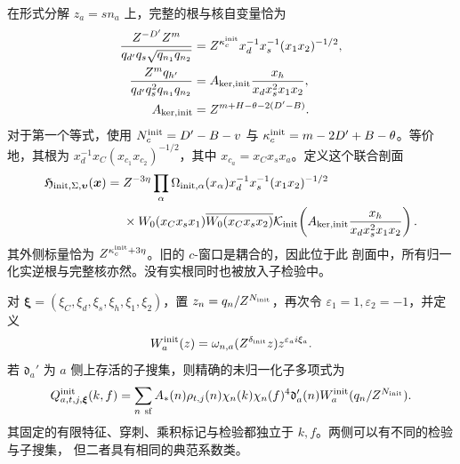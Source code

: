 在形式分解 \(z_a=sn_a\) 上，完整的根与核自变量恰为
\begin{equation}\label{eq:initial-root-kernel}
 \begin{split}
 \frac{Z^{-D'}Z^m}{q_{d'}q_s\sqrt{q_{n_1}q_{n_2}}}
 &=Z^{\kappa_c^{\rm init}}x_d^{-1}x_s^{-1}(x_1x_2)^{-1/2},\\
 \frac{Z^mq_{h'}}{q_{d'}q_s^2q_{n_1}q_{n_2}}
 &=A_{{\rm ker},{\rm init}}\frac{x_h}{x_dx_s^2x_1x_2},\\
 A_{{\rm ker},{\rm init}}&=Z^{m+H-\theta-2(D'-B)}.
 \end{split}
\end{equation}
对于第一个等式，使用 \(N_c^{\rm init}=D'-B-v\) 与
\(\kappa_c^{\rm init}=m-2D'+B-\theta\)。等价地，其根为
\(x_d^{-1}x_C(x_{c_1}x_{c_2})^{-1/2}\)，其中 \(x_{c_a}=x_Cx_sx_a\)。定义这个联合剖面
\begin{equation}\label{eq:initial-joint-profile}
 \begin{split}
 \mathfrak H_{{\rm init},\Sigma,\boldsymbol\upsilon}(\boldsymbol x)
 ={}&Z^{-3\eta}\prod_\alpha\Omega_{{\rm init},\alpha}(x_\alpha)
 x_d^{-1}x_s^{-1}(x_1x_2)^{-1/2}\\
 &\times W_0(x_Cx_sx_1)\overline{W_0(x_Cx_sx_2)}
 \mathcal K_{\rm init}\!\left(
 A_{{\rm ker},{\rm init}}\frac{x_h}{x_dx_s^2x_1x_2}\right).
 \end{split}
\end{equation}
其外侧标量恰为 \(Z^{\kappa_c^{\rm init}+3\eta}\)。旧的 \(c\)-窗口是耦合的，因此位于此
剖面中，所有归一化实逆根与完整核亦然。没有实根同时也被放入子检验中。

对 \(\boldsymbol\xi=(\xi_C,\xi_d,\xi_s,\xi_h,\xi_1,\xi_2)\)，置
\(z_n=q_n/Z^{N_{\rm init}}\)，再次令 \(\varepsilon_1=1,\varepsilon_2=-1\)，并定义
\[
 W_a^{\rm init}(z)=\omega_{n,a}(Z^{\delta_{\rm init}}z)
                       z^{\varepsilon_a i\xi_a}.
\]
若 \(\mathfrak d_a'\) 为 \(a\) 侧上存活的子搜集，则精确的未归一化子多项式为
\begin{equation}\label{eq:initial-child-polynomial}
 Q^{\rm init}_{a,t,j,\boldsymbol\xi}(k,f)
 =\sum_{n\ {\rm sf}}A_*(n)\rho_{t,j}(n)
 \chi_n(k)\chi_n(f)^4\mathfrak d_a'(n)
 W_a^{\rm init}(q_n/Z^{N_{\rm init}}).
\end{equation}
其固定的有限特征、穿刺、乘积标记与检验都独立于 \(k,f\)。两侧可以有不同的检验与子搜集，
但二者具有相同的典范系数类。


